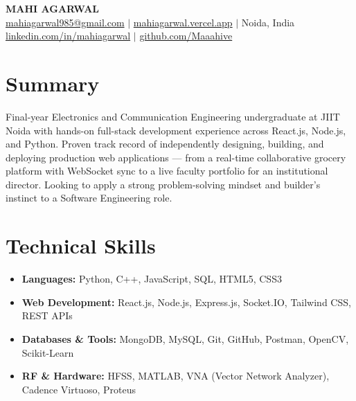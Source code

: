 \documentclass[11pt, a4paper]{article}
\begin{document}
\begin{center}
    {\LARGE \textbf{MAHI AGARWAL}}\\[6pt]
    \small
    \hspace{3pt} \href{mailto:mahiagarwal985@gmail.com}{mahiagarwal985@gmail.com} \hspace{10pt}$\vert$\hspace{10pt}
    \hspace{3pt} \href{https://mahiagarwal.vercel.app}{mahiagarwal.vercel.app} \hspace{10pt}$\vert$\hspace{10pt}
    \hspace{3pt} Noida, India\\[4pt]
    \hspace{3pt} \href{https://linkedin.com/in/mahiagarwal}{linkedin.com/in/mahiagarwal} \hspace{10pt}$\vert$\hspace{10pt}
    \hspace{3pt} \href{https://github.com/Maaahive}{github.com/Maaahive}
\end{center}

\vspace{-6pt}

\section*{Summary}
\vspace{-2pt}
\small
Final-year Electronics and Communication Engineering undergraduate at JIIT Noida with hands-on full-stack development experience across React.js, Node.js, and Python. Proven track record of independently designing, building, and deploying production web applications --- from a real-time collaborative grocery platform with WebSocket sync to a live faculty portfolio for an institutional director. Looking to apply a strong problem-solving mindset and builder's instinct to a Software Engineering role.

\section*{Technical Skills}
\vspace{-2pt}
\begin{itemize}[leftmargin=*, itemsep=2pt]
    \small
    \item \textbf{Languages:} Python, C++, JavaScript, SQL, HTML5, CSS3
    \item \textbf{Web Development:} React.js, Node.js, Express.js, Socket.IO, Tailwind CSS, REST APIs
    \item \textbf{Databases \& Tools:} MongoDB, MySQL, Git, GitHub, Postman, OpenCV, Scikit-Learn
    \item \textbf{RF \& Hardware:} HFSS, MATLAB, VNA (Vector Network Analyzer), Cadence Virtuoso, Proteus
\end{itemize}
\end{document}
